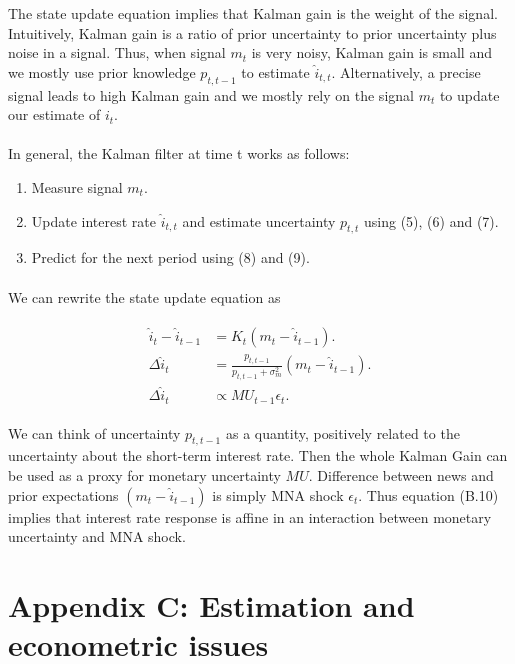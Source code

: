 \documentclass[12pt]{article}
\begin{document}
The state update equation implies that Kalman gain is the weight of the signal. Intuitively, Kalman gain is a ratio of prior uncertainty to prior uncertainty plus noise in a signal. Thus, when signal $m_t$ is very noisy, Kalman gain is small and we mostly use prior knowledge $p_{t,t-1}$ to estimate $\hat{i}_{t,t}$. Alternatively, a precise signal leads to high Kalman gain and we mostly rely on the signal $m_t$ to update our estimate of $i_t$. 
\paragraph{}
In general, the Kalman filter at time t works as follows:
\begin{enumerate}
    \item {Measure signal $m_t$.}
    \item {Update interest rate $\hat{i}_{t,t}$ and estimate uncertainty $p_{t,t}$ using (5), (6) and (7).}
    \item {Predict for the next period using (8) and (9).}
\end{enumerate}
\paragraph{}
We can rewrite the state update equation as

\begin{align}
\begin{split}
\hat{i}_t - \hat{i}_{t-1} & = K_t (m_t - \hat{i}_{t-1}). \\
\Delta \hat{i}_t & = \frac{p_{t,t-1}}{p_{t,t-1}+\sigma^2_{m}} (m_t - \hat{i}_{t-1}). \\
\Delta \hat{i}_t & \propto MU_{t-1} \epsilon_t.
\end{split}
\end{align}

We can think of uncertainty ${p_{t,t-1}}$ as a quantity, positively related to the uncertainty about the short-term interest rate. Then the whole Kalman Gain can be used as a proxy for monetary uncertainty $MU$. Difference between news and prior expectations $(m_t - \hat{i}_{t-1})$ is simply MNA shock $\epsilon_t$. Thus equation (B.10) implies that interest rate response is affine in an interaction between monetary uncertainty and MNA shock.

\pagebreak
\clearpage

\section{Appendix C: Estimation and econometric issues} \label{sec:Model}
\setcounter{equation}{0}
\renewcommand{\theequation}{C\thechapter.\arabic{equation}}
\end{document}
